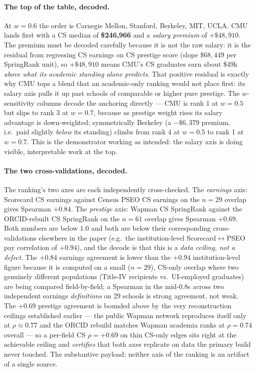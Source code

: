 \documentclass[11pt]{article}
\begin{document}
\paragraph{The top of the table, decoded.} At $w=0.6$ the order is Carnegie Mellon, Stanford, Berkeley, MIT, UCLA. CMU lands first with a CS median of \textbf{\$246{,}966} and a \emph{salary premium} of \textbf{$+\$48{,}910$}. The premium must be decoded carefully because it is not the raw salary: it is the residual from regressing CS earnings on CS prestige score (slope $\$68{,}449$ per SpringRank unit), so $+\$48{,}910$ means CMU's CS graduates earn about \$49k \emph{above what its academic standing alone predicts}. That positive residual is exactly why CMU tops a blend that an academic-only ranking would not place first: its salary axis pulls it up past schools of comparable or higher pure prestige. The $w$-sensitivity columns decode the anchoring directly --- CMU is rank 1 at $w=0.5$ but slips to rank 3 at $w=0.7$, because as prestige weight rises its salary advantage is down-weighted; symmetrically Berkeley (a $-\$6{,}379$ premium, i.e.\ paid slightly \emph{below} its standing) climbs from rank 4 at $w=0.5$ to rank 1 at $w=0.7$. This is the demonstrator working as intended: the salary axis is doing visible, interpretable work at the top.

\paragraph{The two cross-validations, decoded.} The ranking's two axes are each independently cross-checked. The \emph{earnings} axis: Scorecard CS earnings against Census PSEO CS earnings on the $n=29$ overlap gives Spearman \textbf{$+0.84$}. The \emph{prestige} axis: Wapman CS SpringRank against the ORCID-rebuilt CS SpringRank on the $n=61$ overlap gives Spearman \textbf{$+0.69$}. Both numbers are below $1.0$ and both are below their corresponding cross-validations elsewhere in the paper (e.g.\ the institution-level Scorecard$\leftrightarrow$PSEO pay correlation of $+0.94$), and the decode is that this is a \emph{data ceiling, not a defect}. The $+0.84$ earnings agreement is lower than the $+0.94$ institution-level figure because it is computed on a small ($n=29$), CS-only overlap where two genuinely different populations (Title-IV recipients vs.\ UI-employed graduates) are being compared field-by-field; a Spearman in the mid-$0.8$s across two independent earnings \emph{definitions} on 29 schools is strong agreement, not weak. The $+0.69$ prestige agreement is bounded above by the very reconstruction ceilings established earlier --- the public Wapman network reproduces itself only at $\rho\approx0.77$ and the ORCID rebuild matches Wapman academia ranks at $\rho=0.74$ overall --- so a per-field CS $\rho=+0.69$ on thin CS-only edges sits right at the achievable ceiling and \emph{certifies} that both axes replicate on data the primary build never touched. The substantive payload: neither axis of the ranking is an artifact of a single source.
\end{document}
